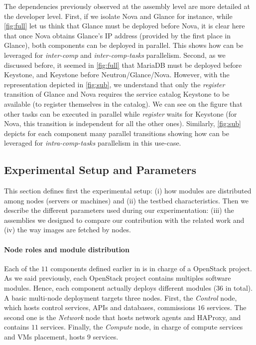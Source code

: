 The dependencies previously observed at the assembly level are more
detailed at the developer level. First, if we isolate Nova and Glance
for instance, while \cref{fig:full} let us think that Glance must be
deployed before Nova, it is clear here that once Nova obtains Glance's
IP address (provided by the first place in Glance), both components
can be deployed in parallel. This shows how \mad can be leveraged for
\emph{inter-comp} and \emph{inter-comp-tasks} parallelism.  Second, as we
discussed before, it seemed in \cref{fig:full} that MariaDB must be
deployed before Keystone, and Keystone before
Neutron/Glance/Nova. However, with the \mad representation depicted in
\cref{fig:sub}, we understand that only the \emph{register} transition
of Glance and Nova requires the service catalog Keystone to be
available (\ie to register themselves in the catalog). We can see on
the figure that other tasks can be executed in parallel while
\emph{register} waits for Keystone (\eg for Nova, this transition is
independent for all the other ones). Similarly, \cref{fig:sub} depicts
for each component many parallel transitions showing how \mad can be
leveraged for \emph{intra-comp-tasks} parallelism in this use-case.


\subsection{Experimental Setup and Parameters}

This section defines first the experimental setup: (i) how modules are
distributed among nodes (\ie servers or machines) and (ii) the testbed
characteristics. Then we describe the different parameters used during
our experimentation: (iii) the assemblies we designed to compare our
contribution with the related work and (iv) the way \docker images are
fetched by nodes.

\paragraph{Node roles and module distribution}
Each of the $11$ components defined earlier in \kolla is in charge of
a OpenStack project. As we said previously, each OpenStack project
contains multiples software modules. Hence, each component actually
deploys different modules ($36$ in total). A basic multi-node \kolla
deployment targets three nodes. First, the \emph{Control} node, which
hosts control services, APIs and databases, commissions $16$
services. The second one is the \emph{Network} node that hosts network
agents and HAProxy, and contains $11$ services. Finally, the
\emph{Compute} node, in charge of compute services and VMs placement,
hosts $9$ services.

